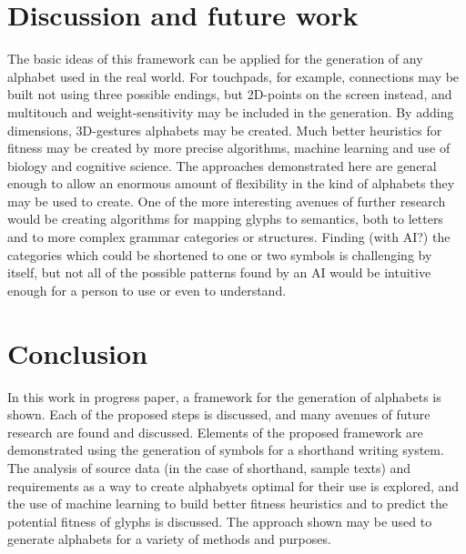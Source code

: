 \documentclass{vgtc}                          %
\begin{document}
\section{Discussion and future work}
The basic ideas of this framework can be applied for the generation of any alphabet used in the real world. For touchpads, for example, connections may be built not using three possible endings, but 2D-points on the screen instead, and multitouch and weight-sensitivity may be included in the generation. By adding dimensions, 3D-gestures alphabets may be created. Much better heuristics for fitness may be created by more precise algorithms, machine learning and use of biology and cognitive science. The approaches demonstrated here are general enough to allow an enormous amount of flexibility in the kind of alphabets they may be used to create.
	One of the more interesting avenues of further research would be creating algorithms for mapping glyphs to semantics, both to letters and to more complex grammar categories or structures. Finding (with AI?) the categories which could be shortened to one or two symbols is challenging by itself, but not all of the possible patterns found by an AI would be intuitive enough for a person to use or even to understand. 

\section{Conclusion}
In this work in progress paper, a framework for the generation of alphabets is shown. Each of the proposed steps is discussed, and many avenues of future research are found and discussed.  Elements of the proposed framework are demonstrated using the generation of symbols for a shorthand writing system. The analysis of source data (in the case of shorthand, sample texts) and requirements as a way to create alphabyets optimal for their use is explored, and the use of machine learning to build better fitness heuristics and to predict the potential fitness of glyphs is discussed. The approach shown may be used to generate alphabets for a variety of methods and purposes.


%

%
%
%


\end{document}
